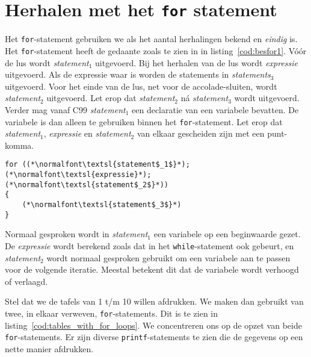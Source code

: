 \textbf{}


%
%
%

\section{Herhalen met het \texttt{for} statement}
Het \texttt{for}-statement gebruiken we als het aantal herhalingen bekend en \textsl{eindig} is. Het \texttt{for}-statement heeft de gedaante zoals te zien in in listing~\ref{cod:besfor1}.
Vóór de lus wordt \textsl{statement}$_1$ uitgevoerd. Bij het herhalen van de lus wordt \textsl{expressie} uitgevoerd. Als de expressie waar is worden de statements in \textsl{statements$_3$} uitgevoerd. Voor het einde van de lus, net voor de accolade-sluiten, wordt \textsl{statement$_2$} uitgevoerd. Let erop dat  \textsl{statement$_2$} ná \textsl{statement$_3$} wordt uitgevoerd. Verder mag vanaf C99 \textsl{statement$_1$} een declaratie van een variabele bevatten. De variabele is dan alleen te gebruiken binnen het \texttt{for}-statement. Let erop dat  \textsl{statement$_1$}, \textsl{expressie} en \textsl{statement$_2$} van elkaar gescheiden zijn met een punt-komma.

\begin{lstlisting}[caption=Opzet van het \texttt{for}-statement.,label=cod:besfor1]
for ((*\normalfont\textsl{statement$_1$}*); (*\normalfont\textsl{expressie}*); (*\normalfont\textsl{statement$_2$}*))
{
    (*\normalfont\textsl{statement$_3$}*)
}
\end{lstlisting}

Normaal gesproken wordt in \textsl{statement$_1$} een variabele op een beginwaarde gezet. De \textsl{expressie} wordt berekend zoals dat in het \texttt{while}-statement ook gebeurt, en \textsl{statement$_2$} wordt normaal gesproken gebruikt om een variabele aan te passen voor de volgende iteratie. Meestal betekent dit dat de variabele wordt verhoogd of verlaagd.

Stel dat we de tafels van 1 t/m 10 willen afdrukken. We maken dan gebruikt van twee, in elkaar verweven, \texttt{for}-statements. Dit is te zien in listing~\ref{cod:tables_with_for_loops}. We concentreren ons op de opzet van beide \texttt{for}-statements. Er zijn diverse \texttt{printf}-statements te zien die de gegevens op een nette manier afdrukken.

